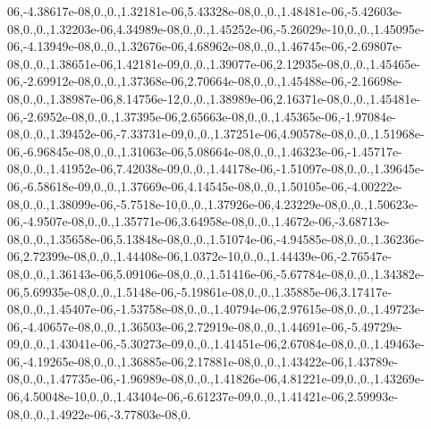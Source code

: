 {\/06,-\/4.\-38617e-\/08,0.,0.,1.\-32181e-\/06,5.\-43328e-\/08,0.,0.,1.\-48481e-\/06,-\/5.\-42603e-\/08,0.,0.,1.\-32203e-\/06,4.\-34989e-\/08,0.,0.,1.\-45252e-\/06,-\/5.\-26029e-\/10,0.,0.,1.\-45095e-\/06,-\/4.\-13949e-\/08,0.,0.,1.\-32676e-\/06,4.\-68962e-\/08,0.,0.,1.\-46745e-\/06,-\/2.\-69807e-\/08,0.,0.,1.\-38651e-\/06,1.\-42181e-\/09,0.,0.,1.\-39077e-\/06,2.\-12935e-\/08,0.,0.,1.\-45465e-\/06,-\/2.\-69912e-\/08,0.,0.,1.\-37368e-\/06,2.\-70664e-\/08,0.,0.,1.\-45488e-\/06,-\/2.\-16698e-\/08,0.,0.,1.\-38987e-\/06,8.\-14756e-\/12,0.,0.,1.\-38989e-\/06,2.\-16371e-\/08,0.,0.,1.\-45481e-\/06,-\/2.\-6952e-\/08,0.,0.,1.\-37395e-\/06,2.\-65663e-\/08,0.,0.,1.\-45365e-\/06,-\/1.\-97084e-\/08,0.,0.,1.\-39452e-\/06,-\/7.\-33731e-\/09,0.,0.,1.\-37251e-\/06,4.\-90578e-\/08,0.,0.,1.\-51968e-\/06,-\/6.\-96845e-\/08,0.,0.,1.\-31063e-\/06,5.\-08664e-\/08,0.,0.,1.\-46323e-\/06,-\/1.\-45717e-\/08,0.,0.,1.\-41952e-\/06,7.\-42038e-\/09,0.,0.,1.\-44178e-\/06,-\/1.\-51097e-\/08,0.,0.,1.\-39645e-\/06,-\/6.\-58618e-\/09,0.,0.,1.\-37669e-\/06,4.\-14545e-\/08,0.,0.,1.\-50105e-\/06,-\/4.\-00222e-\/08,0.,0.,1.\-38099e-\/06,-\/5.\-7518e-\/10,0.,0.,1.\-37926e-\/06,4.\-23229e-\/08,0.,0.,1.\-50623e-\/06,-\/4.\-9507e-\/08,0.,0.,1.\-35771e-\/06,3.\-64958e-\/08,0.,0.,1.\-4672e-\/06,-\/3.\-68713e-\/08,0.,0.,1.\-35658e-\/06,5.\-13848e-\/08,0.,0.,1.\-51074e-\/06,-\/4.\-94585e-\/08,0.,0.,1.\-36236e-\/06,2.\-72399e-\/08,0.,0.,1.\-44408e-\/06,1.\-0372e-\/10,0.,0.,1.\-44439e-\/06,-\/2.\-76547e-\/08,0.,0.,1.\-36143e-\/06,5.\-09106e-\/08,0.,0.,1.\-51416e-\/06,-\/5.\-67784e-\/08,0.,0.,1.\-34382e-\/06,5.\-69935e-\/08,0.,0.,1.\-5148e-\/06,-\/5.\-19861e-\/08,0.,0.,1.\-35885e-\/06,3.\-17417e-\/08,0.,0.,1.\-45407e-\/06,-\/1.\-53758e-\/08,0.,0.,1.\-40794e-\/06,2.\-97615e-\/08,0.,0.,1.\-49723e-\/06,-\/4.\-40657e-\/08,0.,0.,1.\-36503e-\/06,2.\-72919e-\/08,0.,0.,1.\-44691e-\/06,-\/5.\-49729e-\/09,0.,0.,1.\-43041e-\/06,-\/5.\-30273e-\/09,0.,0.,1.\-41451e-\/06,2.\-67084e-\/08,0.,0.,1.\-49463e-\/06,-\/4.\-19265e-\/08,0.,0.,1.\-36885e-\/06,2.\-17881e-\/08,0.,0.,1.\-43422e-\/06,1.\-43789e-\/08,0.,0.,1.\-47735e-\/06,-\/1.\-96989e-\/08,0.,0.,1.\-41826e-\/06,4.\-81221e-\/09,0.,0.,1.\-43269e-\/06,4.\-50048e-\/10,0.,0.,1.\-43404e-\/06,-\/6.\-61237e-\/09,0.,0.,1.\-41421e-\/06,2.\-59993e-\/08,0.,0.,1.\-4922e-\/06,-\/3.\-77803e-\/08,0.\-}
